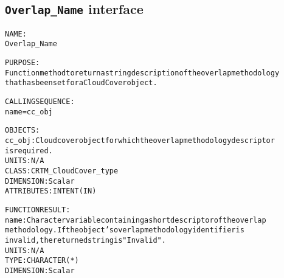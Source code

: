 \subsection{\texttt{Overlap\_Name} interface}
  \label{sec:Overlap_Name_interface}
  \begin{alltt}
 
  NAME:
    Overlap_Name
 
  PURPOSE:
    Function method to return a string description of the overlap methodology
    that has been set for a CloudCover object.
 
  CALLING SEQUENCE:
    name = cc_obj%Overlap_Name()
 
  OBJECTS:
    cc_obj:  Cloud cover object for which the overlap methodology descriptor
             is required.
             UNITS:      N/A
             CLASS:      CRTM_CloudCover_type
             DIMENSION:  Scalar
             ATTRIBUTES: INTENT(IN)
 
  FUNCTION RESULT:
    name:    Character variable containing a short descriptor of the overlap
             methodology. If the object's overlap methodology identifier is
             invalid, the returned string is "Invalid".
             UNITS:      N/A
             TYPE:       CHARACTER(*)
             DIMENSION:  Scalar
 
  \end{alltt}
